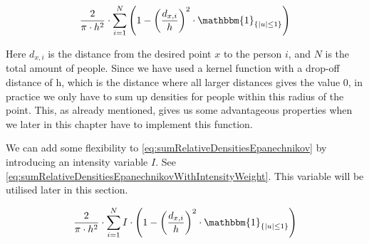\begin{equation}
\label{eq:sumRelativeDensitiesEpanechnikov}
\frac{2}{\pi \cdot h^2} \cdot \sum_{i=1}^N \left(1-\left(\frac{d_{x,i}}{h}\right)^2 \cdot \mathbbm{1}_{\{|u| \leq 1\} }\right)
\end{equation}

Here $d_{x,i}$ is the distance from the desired point $x$ to the person $i$, and $N$ is the total amount of people. Since we have used a kernel function with a drop-off distance of h, which is the distance where all larger distances gives the value 0, in practice we only have to sum up densities for people within this radius of the point. This, as already mentioned, gives us some advantageous properties when we later in this chapter have to implement this function.

We can add some flexibility to \cref{eq:sumRelativeDensitiesEpanechnikov} by introducing an intensity variable $I$. See \cref{eq:sumRelativeDensitiesEpanechnikovWithIntensityWeight}. This variable will be utilised later in this section.

\begin{equation}
\label{eq:sumRelativeDensitiesEpanechnikovWithIntensityWeight}
\frac{2}{\pi \cdot h^2} \cdot \sum_{i=1}^N I \cdot \left(1-\left(\frac{d_{x,i}}{h}\right)^2 \cdot \mathbbm{1}_{\{|u| \leq 1\} }\right)
\end{equation}






